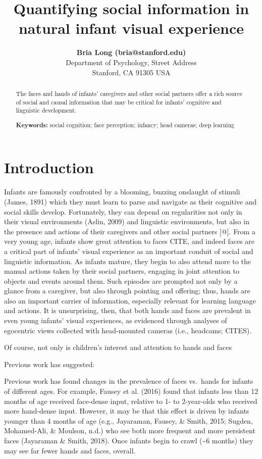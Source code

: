 \documentclass[10pt, letterpaper]{article}
\title{Quantifying social information in natural infant visual experience}
\author{{\large \bf Bria Long (bria@stanford.edu)}  \AND {\large \bf George Kachergis (kachergis@stanford.edu)}  \AND {\large \bf Ketan Jay Agarwal (agrawalk@stanford.edu)}  \AND {\large \bf Michael C. Frank (mcfrank@stanford.edu)} \\  Department of Psychology, Street Address \\ Stanford, CA 91305 USA}
\begin{document}
\maketitle

\begin{abstract}
The faces and hands of infants' caregivers and other social partners
offer a rich source of social and causal information that may be
critical for infants' cognitive and linguistic development.

\textbf{Keywords:}
social cognition; face perception; infancy; head cameras; deep learning
\end{abstract}

\hypertarget{introduction}{%
\section{Introduction}\label{introduction}}

Infants are famously confronted by a blooming, buzzing onslaught of
stimuli (James, 1891) which they must learn to parse and navigate as
their cognitive and social skills develop. Fortunately, they can depend
on regularities not only in their visual environments (Aslin, 2009) and
linguistic environments, but also in the presence and actions of their
caregivers and other social partners {[}@{]}. From a very young age,
infants show great attention to faces CITE, and indeed faces are a
critical part of infants' visual experience as an important conduit of
social and linguistic information. As infants mature, they begin to also
attend more to the manual actions taken by their social partners,
engaging in joint attention to objects and events around them. Such
episodes are prompted not only by a glance from a caregiver, but also
through pointing and offering; thus, hands are also an important carrier
of information, especially relevant for learning language and actions.
It is unsurprising, then, that both hands and faces are prevalent in
even young infants' visual experiences, as evidenced through analyses of
egocentric views collected with head-mounted cameras (i.e., headcams;
CITES).

Of course, not only is children's interest and attention to hands and
faces

Previous work has suggested:

Previous work has found changes in the prevalence of faces vs.~hands for
infants of different ages. For example, Fausey et al. (2016) found that
infants less than 12 months of age received face-dense input, relative
to 1- to 2-year-olds who received more hand-dense input. However, it may
be that this effect is driven by infants younger than 4 months of age
(e.g., Jayaraman, Fausey, \& Smith, 2015; Sugden, Mohamed-Ali, \&
Moulson, n.d.) who see both more frequent and more persistent faces
(Jayaraman \& Smith, 2018). Once infants begin to crawl
(\textasciitilde{}6 months) they may see far fewer hands and faces,
overall.
\end{document}
